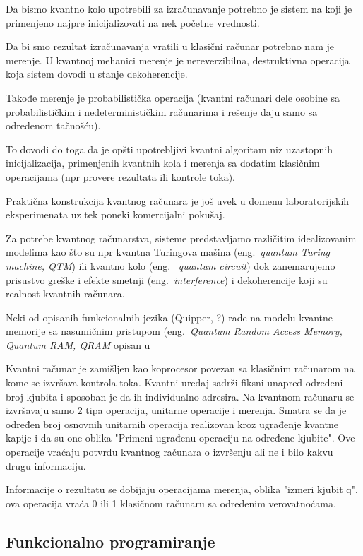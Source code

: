 \documentclass[a4paper]{article}
\begin{document}
{Da bismo kvantno kolo upotrebili za izračunavanje potrebno je sistem na koji je primenjeno najpre inicijalizovati na nek početne vrednosti.

Da bi smo rezultat izračunavanja vratili u klasični računar potrebno nam je merenje. U kvantnoj mehanici merenje je nereverzibilna, destruktivna operacija koja sistem dovodi u stanje dekoherencije.

Takođe merenje je probabilistička operacija (kvantni računari dele osobine sa probabilističkim i nedeterminističkim računarima i rešenje daju samo sa određenom tačnošću).

To dovodi do toga da je opšti upotrebljivi kvantni algoritam niz uzastopnih inicijalizacija, primenjenih kvantnih kola i merenja sa dodatim klasičnim operacijama (npr provere rezultata ili kontrole toka).

Praktična konstrukcija kvantnog računara je još uvek u domenu laboratorijskih eksperimenata uz tek poneki komercijalni pokušaj.

Za potrebe kvantnog računarstva, sisteme predstavljamo različitim idealizovanim modelima kao što su npr kvantna Turingova mašina (eng.~\emph{quantum Turing machine, QTM}) ili kvantno kolo (eng. ~\emph{quantum circuit}) dok zanemarujemo prisustvo greške i efekte smetnji (eng.~\emph{interference}) i dekoherencije koji su realnost kvantnih računara.

Neki od opisanih funkcionalnih jezika (Quipper, ?) rade na modelu kvantne memorije sa nasumičnim pristupom (eng.~\emph{Quantum Random Access Memory, Quantum RAM, QRAM} opisan u \cite{qram_model}

Kvantni računar je zamišljen kao koprocesor povezan sa klasičnim računarom na kome se izvršava kontrola toka. Kvantni uređaj sadrži fiksni unapred određeni broj kjubita i sposoban je da ih individualno adresira. Na kvantnom računaru se izvršavaju samo 2 tipa operacija, unitarne operacije i merenja.  Smatra se da je određen broj osnovnih unitarnih operacija realizovan kroz ugrađenje kvantne kapije i da su one oblika "Primeni ugrađenu operaciju na određene kjubite". Ove operacije vraćaju potvrdu kvantnog računara o izvršenju ali ne i bilo kakvu drugu informaciju.

Informacije o rezultatu se dobijaju operacijama merenja, oblika "izmeri kjubit q", ova operacija vraća 0 ili 1 klasičnom računaru sa određenim verovatnoćama.

\subsection{Funkcionalno programiranje}
\label{sec:funkcionalniprgjezici}

}
\end{document}
